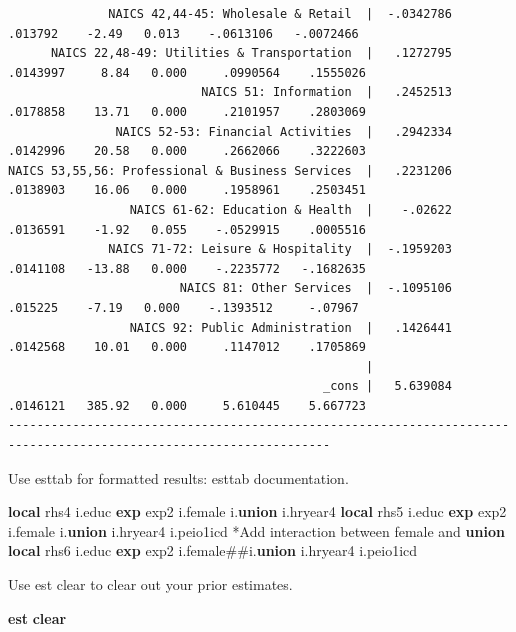 \documentclass[
]{book}
\newenvironment{Shaded}{\begin{snugshade}}{\end{snugshade}}
\newcommand{\FunctionTok}[1]{\textcolor[rgb]{0.13,0.29,0.53}{\textbf{#1}}}
\newcommand{\KeywordTok}[1]{\textcolor[rgb]{0.13,0.29,0.53}{\textbf{#1}}}
\newcommand{\NormalTok}[1]{#1}
\begin{document}
\begin{verbatim}
              NAICS 42,44-45: Wholesale & Retail  |  -.0342786    .013792    -2.49   0.013    -.0613106   -.0072466
      NAICS 22,48-49: Utilities & Transportation  |   .1272795   .0143997     8.84   0.000     .0990564    .1555026
                           NAICS 51: Information  |   .2452513   .0178858    13.71   0.000     .2101957    .2803069
               NAICS 52-53: Financial Activities  |   .2942334   .0142996    20.58   0.000     .2662066    .3222603
NAICS 53,55,56: Professional & Business Services  |   .2231206   .0138903    16.06   0.000     .1958961    .2503451
                 NAICS 61-62: Education & Health  |    -.02622   .0136591    -1.92   0.055    -.0529915    .0005516
              NAICS 71-72: Leisure & Hospitality  |  -.1959203   .0141108   -13.88   0.000    -.2235772   -.1682635
                        NAICS 81: Other Services  |  -.1095106    .015225    -7.19   0.000    -.1393512     -.07967
                 NAICS 92: Public Administration  |   .1426441   .0142568    10.01   0.000     .1147012    .1705869
                                                  |
                                            _cons |   5.639084   .0146121   385.92   0.000     5.610445    5.667723
-------------------------------------------------------------------------------------------------------------------
\end{verbatim}

Use esttab for formatted results:
esttab documentation.

\begin{Shaded}
\begin{Highlighting}[]
\KeywordTok{local}\NormalTok{ rhs4 i.educ }\FunctionTok{exp}\NormalTok{ exp2 i.female i.}\KeywordTok{union}\NormalTok{ i.hryear4 }
\KeywordTok{local}\NormalTok{ rhs5 i.educ }\FunctionTok{exp}\NormalTok{ exp2 i.female i.}\KeywordTok{union}\NormalTok{ i.hryear4 i.peio1icd}
\NormalTok{*Add interaction between female and }\KeywordTok{union}
\KeywordTok{local}\NormalTok{ rhs6 i.educ }\FunctionTok{exp}\NormalTok{ exp2 i.female\#\#i.}\KeywordTok{union}\NormalTok{ i.hryear4 i.peio1icd}
\end{Highlighting}
\end{Shaded}

Use est clear to clear out your prior estimates.

\begin{Shaded}
\begin{Highlighting}[]
\KeywordTok{est} \KeywordTok{clear}
\end{Highlighting}
\end{Shaded}
\end{document}
